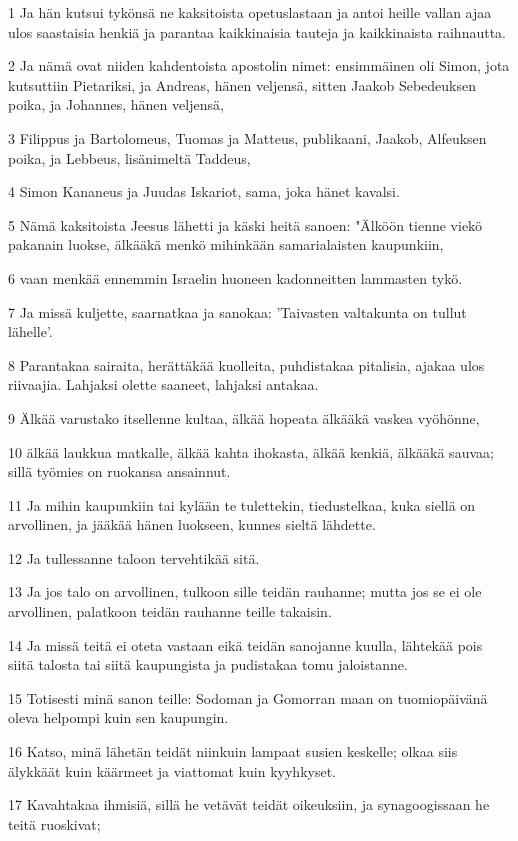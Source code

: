 \par 1 Ja hän kutsui tykönsä ne kaksitoista opetuslastaan ja antoi heille vallan ajaa ulos saastaisia henkiä ja parantaa kaikkinaisia tauteja ja kaikkinaista raihnautta.
\par 2 Ja nämä ovat niiden kahdentoista apostolin nimet: ensimmäinen oli Simon, jota kutsuttiin Pietariksi, ja Andreas, hänen veljensä, sitten Jaakob Sebedeuksen poika, ja Johannes, hänen veljensä,
\par 3 Filippus ja Bartolomeus, Tuomas ja Matteus, publikaani, Jaakob, Alfeuksen poika, ja Lebbeus, lisänimeltä Taddeus,
\par 4 Simon Kananeus ja Juudas Iskariot, sama, joka hänet kavalsi.
\par 5 Nämä kaksitoista Jeesus lähetti ja käski heitä sanoen: "Älköön tienne viekö pakanain luokse, älkääkä menkö mihinkään samarialaisten kaupunkiin,
\par 6 vaan menkää ennemmin Israelin huoneen kadonneitten lammasten tykö.
\par 7 Ja missä kuljette, saarnatkaa ja sanokaa: 'Taivasten valtakunta on tullut lähelle'.
\par 8 Parantakaa sairaita, herättäkää kuolleita, puhdistakaa pitalisia, ajakaa ulos riivaajia. Lahjaksi olette saaneet, lahjaksi antakaa.
\par 9 Älkää varustako itsellenne kultaa, älkää hopeata älkääkä vaskea vyöhönne,
\par 10 älkää laukkua matkalle, älkää kahta ihokasta, älkää kenkiä, älkääkä sauvaa; sillä työmies on ruokansa ansainnut.
\par 11 Ja mihin kaupunkiin tai kylään te tulettekin, tiedustelkaa, kuka siellä on arvollinen, ja jääkää hänen luokseen, kunnes sieltä lähdette.
\par 12 Ja tullessanne taloon tervehtikää sitä.
\par 13 Ja jos talo on arvollinen, tulkoon sille teidän rauhanne; mutta jos se ei ole arvollinen, palatkoon teidän rauhanne teille takaisin.
\par 14 Ja missä teitä ei oteta vastaan eikä teidän sanojanne kuulla, lähtekää pois siitä talosta tai siitä kaupungista ja pudistakaa tomu jaloistanne.
\par 15 Totisesti minä sanon teille: Sodoman ja Gomorran maan on tuomiopäivänä oleva helpompi kuin sen kaupungin.
\par 16 Katso, minä lähetän teidät niinkuin lampaat susien keskelle; olkaa siis älykkäät kuin käärmeet ja viattomat kuin kyyhkyset.
\par 17 Kavahtakaa ihmisiä, sillä he vetävät teidät oikeuksiin, ja synagoogissaan he teitä ruoskivat;

